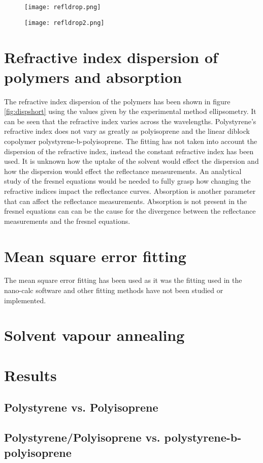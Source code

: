 \documentclass[MasterThesisMain.tex]{subfiles}
\begin{document}
\begin{figure}[H]
\centering
\texttt{[image: refldrop.png]}
\caption{}
\label{fig:drop}
\end{figure}

\begin{figure}[H]
\centering
\texttt{[image: refldrop2.png]}
\caption{}
\label{fig:drop2}
\end{figure}

\section{Refractive index dispersion of polymers and absorption}
The refractive index dispersion of the polymers has been shown in figure \ref{fig:dispshort} using the values given by the experimental method ellipsometry. It can be seen that the refractive index varies across the wavelengths. Polystyrene's refractive index does not vary as greatly as polyisoprene and the linear diblock copolymer polystyrene-b-polyisoprene. The fitting has not taken into account the dispersion of the refractive index, instead the constant refractive index has been used. It is unknown how the uptake of the solvent would effect the dispersion and how the dispersion would effect the reflectance measurements. An analytical study of the fresnel equations would be needed to fully grasp how changing the refractive indices impact the reflectance curves. Absorption is another parameter that can affect the reflectance measurements. Absorption is not present in the fresnel equations can can be the cause for the divergence between the reflectance measurements and the fresnel equations.    


\section{Mean square error fitting}
The mean square error fitting has been used as it was the fitting used in the nano-calc software and other fitting methods have not been studied or implemented.

\section{Solvent vapour annealing}

\section{Results}

\subsection{Polystyrene vs. Polyisoprene}

\subsection{Polystyrene/Polyisoprene vs. polystyrene-b-polyisoprene}
\end{document}
